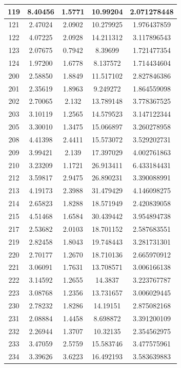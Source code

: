 \begin{table}[!tp]
\begin{tabular}{|c|c|c|c|c|}
		119 & 8.40456 & 1.5771 & 10.99204  & 2.071278448\\ \hline
		121 & 2.47024 & 2.0902 & 10.279925 & 1.976437859\\ \hline
		122 & 4.07225 & 2.0928 & 14.211312 & 3.117896543\\ \hline
		123 & 2.07675 & 0.7942 &  8.39699  & 1.721477354\\ \hline
		124 & 1.97200 & 1.6778 &  8.137572 & 1.714434604\\ \hline
		200 & 2.58850 & 1.8849 & 11.517102 & 2.827846386\\ \hline
		201 & 2.35619 & 1.8963 &  9.249272 & 1.864559098\\ \hline
		202 & 2.70065 & 2.132  & 13.789148 & 3.778367525\\ \hline
		203 & 3.10119 & 1.2565 & 14.579523 & 3.147122344\\ \hline
		205 & 3.30010 & 1.3475 & 15.066897 & 3.260278958\\ \hline
		208 & 4.41398 & 2.4411 & 15.573072 & 3.529202731\\ \hline
		209 & 3.99421 & 2.139  & 17.397029 & 4.002761863\\ \hline	
		210 & 3.23209 & 1.1721 & 26.913411 & 6.433184431\\ \hline
		212 & 3.59817 & 2.9475 & 26.890231 & 3.390088991\\ \hline
		213 & 4.19173 & 2.3988 & 31.479429 & 4.146098275\\ \hline
		214 & 2.65823 & 1.8288 & 18.571949 & 2.420839058\\ \hline
		215 & 4.51468 & 1.6584 & 30.439442 & 3.954894738\\ \hline
		217 & 2.53682 & 2.0103 & 18.701152 & 2.587683551\\ \hline
		219 & 2.82458 & 1.8043 & 19.748443 & 3.281731301\\ \hline
		220 & 2.70177 & 1.2670 & 18.710136 & 2.665970912\\ \hline		
		221 & 3.06091 & 1.7631 & 13.708571 & 3.006166138\\ \hline
		222 & 3.14592 & 1.2655 & 14.3837   & 3.223767787\\ \hline
		223 & 3.08768 & 1.2356 & 13.731657 & 3.006029445\\ \hline
		230 & 2.78232 & 1.8286 & 14.19151  & 2.875082168\\ \hline
		231 & 2.08884 & 1.4458 &  8.698872 & 3.391200109\\ \hline
		232 & 2.26944 & 1.3707 & 10.32135  & 2.354562975\\ \hline
		233 & 3.47059 & 2.5759 & 15.583746 & 3.477575961\\ \hline
		234 & 3.39626 & 3.6223 & 16.492193 & 3.583639883\\ \hline
	\end{tabular}
\end{table}

